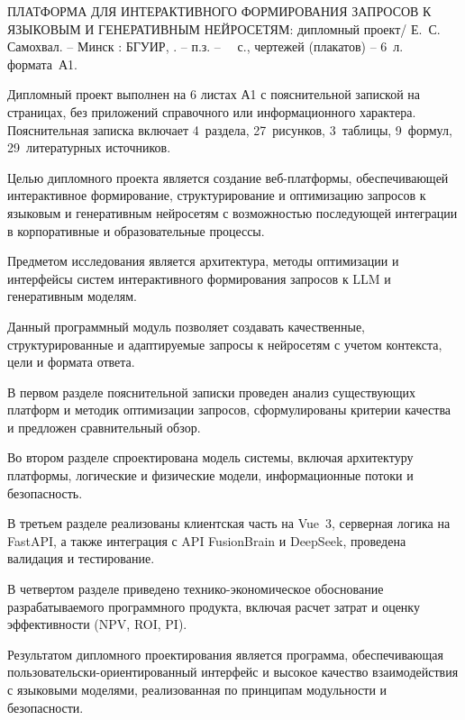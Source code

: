 \thispagestyle{empty}

\MakeUppercase{Платформа для интерактивного формирования запросов к языковым и генеративным нейросетям}: дипломный проект/ Е.~С. Самохвал. -- Минск : БГУИР, \the\year{}. -- п.з. -- ~\pageref*{LastPage}~с., чертежей (плакатов) -- 6~л. формата~А1.

\vspace{4\parsep} 

Дипломный проект выполнен на 6 листах А1 с пояснительной запиской на~\pageref*{LastPage} страницах, без приложений справочного или информационного характера. Пояснительная записка включает 4~раздела, 27~рисунков, 3~таблицы, 9~формул, 29~литературных источников.

Целью дипломного проекта является создание веб-платформы, обеспечивающей интерактивное формирование, структурирование и оптимизацию запросов к языковым и генеративным нейросетям с возможностью последующей интеграции в корпоративные и образовательные процессы.

Предметом исследования является архитектура, методы оптимизации и интерфейсы систем интерактивного формирования запросов к LLM и генеративным моделям.

Данный программный модуль позволяет создавать качественные, структурированные и адаптируемые запросы к нейросетям с учетом контекста, цели и формата ответа.

В первом разделе пояснительной записки проведен анализ существующих платформ и методик оптимизации запросов, сформулированы критерии качества и предложен сравнительный обзор.

Во втором разделе спроектирована модель системы, включая архитектуру платформы, логические и физические модели, информационные потоки и безопасность.

В третьем разделе реализованы клиентская часть на Vue 3, серверная логика на FastAPI, а также интеграция с API FusionBrain и DeepSeek, проведена валидация и тестирование.

В четвертом разделе приведено технико-экономическое обоснование разрабатываемого программного продукта, включая расчет затрат и оценку эффективности (NPV, ROI, PI).

Результатом дипломного проектирования является программа, обеспечивающая пользовательски-ориентированный интерфейс и высокое качество взаимодействия с языковыми моделями, реализованная по принципам модульности и безопасности.


\clearpage